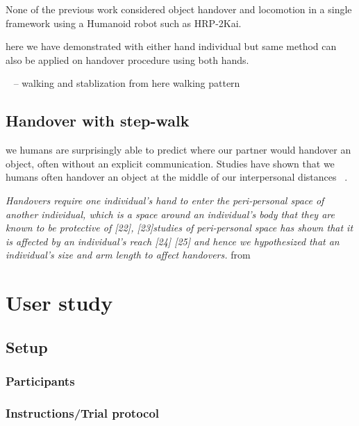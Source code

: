 None of the previous work considered object handover and locomotion in a single framework using a Humanoid robot such as HRP-2Kai.

here we have demonstrated with either hand individual but same method can also be applied on handover procedure using both hands.

~\cite{caron2018stair} -- walking and stablization from here
%
\cite{caron2016humanoids} walking pattern
%

\cite{kajita2010biped}

\subsection{Handover with step-walk}

we humans are surprisingly able to predict where our partner would handover an object, often without an explicit communication. Studies have shown that we humans often handover an object at the middle of our interpersonal distances ~\cite{hansen2017human, kato2018humans, kato2019handovers}.


\textit{ Handovers require one individual’s hand to enter the peri-personal space of another individual, which is a space around an individual’s body that they are known to be protective of [22], [23]studies of peri-personal space has shown that it is affected by an individual’s reach [24] [25] and hence we hypothesized that an individual’s size and arm length to affect handovers. } from ~\cite{kato2019handovers}


\clearpage

\section{User study}

\subsection{Setup}
\subsubsection{Participants}
\subsubsection{Instructions/Trial protocol}


